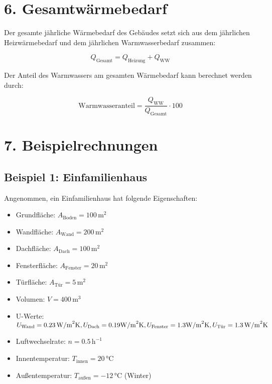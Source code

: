 \documentclass{article}
\begin{document}
\section*{6. Gesamtwärmebedarf}

Der gesamte jährliche Wärmebedarf des Gebäudes setzt sich aus dem jährlichen Heizwärmebedarf und dem jährlichen Warmwasserbedarf zusammen:

\begin{equation}
Q_\text{Gesamt} = Q_\text{Heizung} + Q_\text{WW}
\end{equation}

Der Anteil des Warmwassers am gesamten Wärmebedarf kann berechnet werden durch:

\begin{equation}
\text{Warmwasseranteil} = \frac{Q_\text{WW}}{Q_\text{Gesamt}} \cdot 100
\end{equation}

\section*{7. Beispielrechnungen}

\subsection*{Beispiel 1: Einfamilienhaus}

Angenommen, ein Einfamilienhaus hat folgende Eigenschaften:
\begin{itemize}
    \item Grundfläche: \(A_\text{Boden} = 100 \, \text{m}^2\)
    \item Wandfläche: \(A_\text{Wand} = 200 \, \text{m}^2\)
    \item Dachfläche: \(A_\text{Dach} = 100 \, \text{m}^2\)
    \item Fensterfläche: \(A_\text{Fenster} = 20 \, \text{m}^2\)
    \item Türfläche: \(A_\text{Tür} = 5 \, \text{m}^2\)
    \item Volumen: \(V = 400 \, \text{m}^3\)
    \item U-Werte: 
    {\small \( U_\text{Wand} = 0.23 \, \text{W/m}^2\text{K}, U_\text{Dach} = 0.19 \, \\
            \text{W/m}^2\text{K}, U_\text{Fenster} = 1.3 \, \\
            \text{W/m}^2\text{K}, U_\text{Tür} = 1.3 \, \text{W/m}^2\text{K} \)}
    \item Luftwechselrate: \(n = 0.5 \, \text{h}^{-1}\)
    \item Innentemperatur: \(T_\text{innen} = 20 \, \text{°C}\)
    \item Außentemperatur: \(T_\text{außen} = -12 \, \text{°C}\) (Winter)
\end{itemize}
\end{document}
